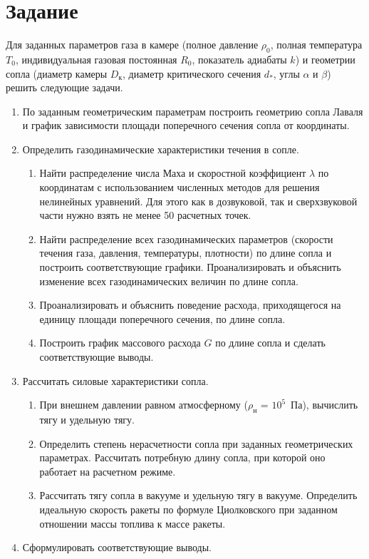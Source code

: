 \documentclass[../homework.tex]{subfiles}
\begin{document}
\section{Задание}

Для заданных параметров газа в камере (полное давление $\rho_{0}$, полная температура $T_{0}$, индивидуальная газовая постоянная $R_{0}$, показатель адиабаты $k$) и геометрии сопла (диаметр камеры $D_{к}$, диаметр критического сечения $d_{*}$, углы $\alpha$ и $\beta$) решить следующие задачи.

\begin{enumerate}
\item
    По заданным геометрическим параметрам построить геометрию сопла Лаваля и график зависимости площади поперечного сечения сопла от координаты.
\item
    Определить газодинамические характеристики течения в сопле.
    \begin{enumerate}
    \item
        Найти распределение числа Маха и скоростной коэффициент $\lambda$ по координатам с использованием численных методов для решения нелинейных уравнений.
        Для этого как в дозвуковой, так и сверхзвуковой части нужно взять не менее 50 расчетных точек.
    \item
        Найти распределение всех газодинамических параметров (скорости течения газа, давления, температуры, плотности) по длине сопла и построить соответствующие графики.
        Проанализировать и объяснить изменение всех газодинамических величин по длине сопла.
    \item
        Проанализировать и объяснить поведение расхода, приходящегося на единицу площади поперечного сечения, по длине сопла.
    \item
        Построить график массового расхода $G$ по длине сопла и сделать соответствующие выводы.
    \end{enumerate}
\item
    Рассчитать силовые характеристики сопла.
    \begin{enumerate}
    \item
        При внешнем давлении равном атмосферному ($\rho_{н}$ = $10^{5}$~Па), вычислить тягу и удельную тягу.
    \item
        Определить степень нерасчетности сопла при заданных геометрических параметрах.
        Рассчитать потребную длину сопла, при которой оно работает на расчетном режиме.
    \item
        Рассчитать тягу сопла в вакууме и удельную тягу в вакууме.
        Определить идеальную скорость ракеты по формуле Циолковского при заданном отношении массы топлива к массе ракеты.
    \end{enumerate}
    \item
        Сформулировать соответствующие выводы.
\end{enumerate}
\end{document}
